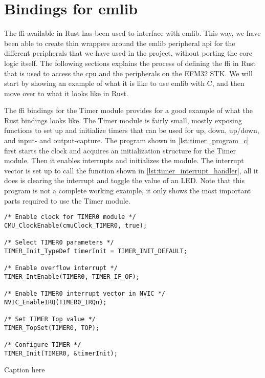 
\section{Bindings for emlib} %
\label{sub:interfacing_with_emlib}

The \gls{ffi} available in Rust has been used to interface with emlib. This way, we have been able
to create thin wrappers around the emlib peripheral \gls{api} for the different peripherals that we
have used in the project, without porting the core logic itself. The following sections explains the
process of defining the \gls{ffi} in Rust that is used to access the \gls{cpu} and the peripherals
on the EFM32 STK. We will start by showing an example of what it is like to use emlib with C, and
then move over to what it looks like in Rust.

The \gls{ffi} bindings for the Timer module \cite{an0014_timer} provides for a good example of what
the Rust bindings looks like. The Timer module is fairly small, mostly exposing functions to set up
and initialize timers that can be used for up, down, up/down, and input- and output-capture. The
program shown in \autoref{lst:timer_program_c} first starts the clock and acquires an initialization
structure for the Timer module. Then it enables interrupts and initializes the module. The interrupt
vector is set up to call the function shown in \autoref{lst:timer_interrupt_handler}, all it does is
clearing the interrupt and toggle the value of an LED. Note that this program is not a complete
working example, it only shows the most important parts required to use the Timer module.

\begin{listing}[tb]
\begin{verbatim}
/* Enable clock for TIMER0 module */
CMU_ClockEnable(cmuClock_TIMER0, true);

/* Select TIMER0 parameters */
TIMER_Init_TypeDef timerInit = TIMER_INIT_DEFAULT;

/* Enable overflow interrupt */
TIMER_IntEnable(TIMER0, TIMER_IF_OF);

/* Enable TIMER0 interrupt vector in NVIC */
NVIC_EnableIRQ(TIMER0_IRQn);

/* Set TIMER Top value */
TIMER_TopSet(TIMER0, TOP);

/* Configure TIMER */
TIMER_Init(TIMER0, &timerInit);
\end{verbatim}
\caption{Caption here}
\label{lst:timer_program_c}
\end{listing}

